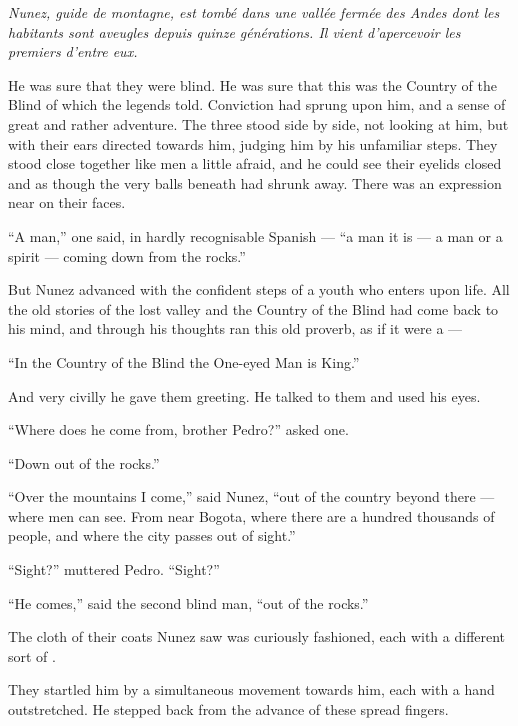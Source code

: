 \documentclass{fiche}
\begin{document}
\noindent\small\textit{Nunez, guide de montagne, est tombé dans une vallée fermée des Andes
dont les habitants sont aveugles depuis quinze générations. Il vient d'apercevoir les
premiers d'entre eux.}\normalsize

\begin{texte}
He was sure that they were blind. He was sure that this was the Country of the Blind of which
the legends told. Conviction had sprung upon him, and a sense of great and rather
 adventure. The three stood side by side, not looking at him,
but with their ears directed towards him, judging him by his unfamiliar steps. They stood
close together like men a little afraid, and he could see their eyelids closed and
 as though the very balls beneath had shrunk away. There
was an expression near  on their faces.

``A man,'' one said, in hardly recognisable Spanish --- ``a man it is --- a man or a spirit
--- coming down from the rocks.''

But Nunez advanced with the confident steps of a youth who enters upon life. All the old
stories of the lost valley and the Country of the Blind had come back to his mind, and through
his thoughts ran this old proverb, as if it were a  ---

``In the Country of the Blind the One-eyed Man is King.''

And very civilly he gave them greeting. He talked to them and used his eyes.

``Where does he come from, brother Pedro?'' asked one.

``Down out of the rocks.''

``Over the mountains I come,'' said Nunez, ``out of the country beyond there --- where men can
see. From near Bogota, where there are a hundred thousands of people, and where the city
passes out of sight.''

``Sight?'' muttered Pedro. ``Sight?''

``He comes,'' said the second blind man, ``out of the rocks.''

The cloth of their coats Nunez saw was curiously fashioned, each with a different sort of
.

They startled him by a simultaneous movement towards him, each with a hand outstretched. He
stepped back from the advance of these spread fingers.


\end{texte}
\end{document}
